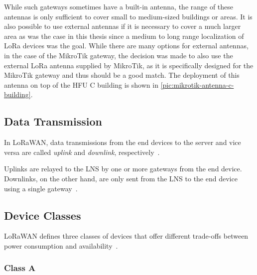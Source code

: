 While such gateways sometimes have a built-in antenna, the range of these antennas is only sufficient to cover small to medium-sized buildings or areas.
It is also possible to use external antennas if it is necessary to cover a much larger area as was the case in this thesis since a medium to long range localization of \ac{LoRa} devices was the goal.
While there are many options for external antennas, in the case of the MikroTik gateway, the decision was made to also use the external \ac{LoRa} antenna supplied by MikroTik, as it is specifically designed for the MikroTik gateway and thus should be a good match.
The deployment of this antenna on top of the \ac{HFU} C building is shown in \cref{pic:mikrotik-antenna-c-building}.

\subsection{Data Transmission}

In LoRaWAN, data transmissions from the end devices to the server and vice versa are called \emph{uplink} and \emph{downlink}, respectively~\cite[p. 12]{lora_alliance_inc_lorawan_specification_2017}.

Uplinks are relayed to the \ac{LNS} by one or more gateways from the end device.
Downlinks, on the other hand, are only sent from the \ac{LNS} to the end device using a single gateway~\cite[p. 12]{lora_alliance_inc_lorawan_specification_2017}.

\subsection{Device Classes}\label{sec:device-classes}

\ac{LoRaWAN} defines three classes of devices that offer different trade-offs between power consumption and availability~\cite[p. 10]{lora_alliance_inc_lorawan_specification_2017}.

\subsubsection{Class A}

